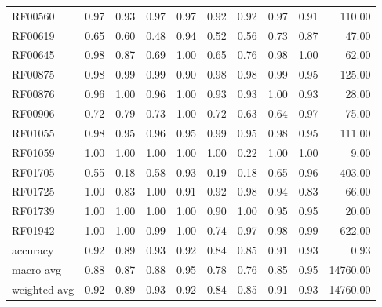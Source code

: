 \begin{tabular}{lrrrrrrrrr}
RF00560      & 0.97 & 0.93 & 0.97 & 0.97 &    0.92 &   0.92 &  0.97 & 0.91 &     110.00 \\
RF00619      & 0.65 & 0.60 & 0.48 & 0.94 &    0.52 &   0.56 &  0.73 & 0.87 &      47.00 \\
RF00645      & 0.98 & 0.87 & 0.69 & 1.00 &    0.65 &   0.76 &  0.98 & 1.00 &      62.00 \\
RF00875      & 0.98 & 0.99 & 0.99 & 0.90 &    0.98 &   0.98 &  0.99 & 0.95 &     125.00 \\
RF00876      & 0.96 & 1.00 & 0.96 & 1.00 &    0.93 &   0.93 &  1.00 & 0.93 &      28.00 \\
RF00906      & 0.72 & 0.79 & 0.73 & 1.00 &    0.72 &   0.63 &  0.64 & 0.97 &      75.00 \\
RF01055      & 0.98 & 0.95 & 0.96 & 0.95 &    0.99 &   0.95 &  0.98 & 0.95 &     111.00 \\
RF01059      & 1.00 & 1.00 & 1.00 & 1.00 &    1.00 &   0.22 &  1.00 & 1.00 &       9.00 \\
RF01705      & 0.55 & 0.18 & 0.58 & 0.93 &    0.19 &   0.18 &  0.65 & 0.96 &     403.00 \\
RF01725      & 1.00 & 0.83 & 1.00 & 0.91 &    0.92 &   0.98 &  0.94 & 0.83 &      66.00 \\
RF01739      & 1.00 & 1.00 & 1.00 & 1.00 &    0.90 &   1.00 &  0.95 & 0.95 &      20.00 \\
RF01942      & 1.00 & 1.00 & 0.99 & 1.00 &    0.74 &   0.97 &  0.98 & 0.99 &     622.00 \\
accuracy     & 0.92 & 0.89 & 0.93 & 0.92 &    0.84 &   0.85 &  0.91 & 0.93 &       0.93 \\
macro avg    & 0.88 & 0.87 & 0.88 & 0.95 &    0.78 &   0.76 &  0.85 & 0.95 &   14760.00 \\
weighted avg & 0.92 & 0.89 & 0.93 & 0.92 &    0.84 &   0.85 &  0.91 & 0.93 &   14760.00 \\
\bottomrule
\end{tabular}
